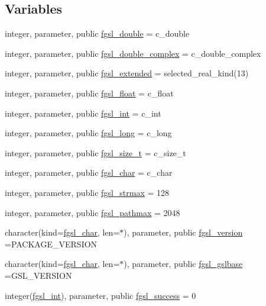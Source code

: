 \subsection*{Variables}
\begin{DoxyCompactItemize}
\item 
integer, parameter, public \hyperlink{namespacefgsl_a9af5113378e0f000eb479d3f90196ddf}{fgsl\+\_\+double} = c\+\_\+double
\item 
integer, parameter, public \hyperlink{namespacefgsl_a66d0fde3788cc0c300046f8fcd07d702}{fgsl\+\_\+double\+\_\+complex} = c\+\_\+double\+\_\+complex
\item 
integer, parameter, public \hyperlink{namespacefgsl_a9f38abe97062020e8a507aaa5bc683ab}{fgsl\+\_\+extended} = selected\+\_\+real\+\_\+kind(13)
\item 
integer, parameter, public \hyperlink{namespacefgsl_a5721fab55a48ca577c4557fdb1861eb6}{fgsl\+\_\+float} = c\+\_\+float
\item 
integer, parameter, public \hyperlink{namespacefgsl_a222deda1d7a0c0e845ce4a683318efeb}{fgsl\+\_\+int} = c\+\_\+int
\item 
integer, parameter, public \hyperlink{namespacefgsl_a22fca1111887118eb07d5f9688ea38ad}{fgsl\+\_\+long} = c\+\_\+long
\item 
integer, parameter, public \hyperlink{namespacefgsl_a82c8fc2281b4c13609c41ae8b7f1cb1e}{fgsl\+\_\+size\+\_\+t} = c\+\_\+size\+\_\+t
\item 
integer, parameter, public \hyperlink{namespacefgsl_a12911ae4a4462f8e892d903081e77ab4}{fgsl\+\_\+char} = c\+\_\+char
\item 
integer, parameter, public \hyperlink{namespacefgsl_a1951faf9d6c8119266db0e5eee1865b7}{fgsl\+\_\+strmax} = 128
\item 
integer, parameter, public \hyperlink{namespacefgsl_a4531e537443b76eab7842214d4e86f01}{fgsl\+\_\+pathmax} = 2048
\item 
character(kind=\hyperlink{namespacefgsl_a12911ae4a4462f8e892d903081e77ab4}{fgsl\+\_\+char}, len=$\ast$), parameter, public \hyperlink{namespacefgsl_a3443bae7bac02745f1562e6c2f891656}{fgsl\+\_\+version} =P\+A\+C\+K\+A\+G\+E\+\_\+\+V\+E\+R\+S\+I\+O\+N
\item 
character(kind=\hyperlink{namespacefgsl_a12911ae4a4462f8e892d903081e77ab4}{fgsl\+\_\+char}, len=$\ast$), parameter, public \hyperlink{namespacefgsl_ad8d3e2a5a480d0a6e9569ef516c5dff4}{fgsl\+\_\+gslbase} =G\+S\+L\+\_\+\+V\+E\+R\+S\+I\+O\+N
\item 
integer(\hyperlink{namespacefgsl_a222deda1d7a0c0e845ce4a683318efeb}{fgsl\+\_\+int}), parameter, public \hyperlink{namespacefgsl_a5637d95a4aceec9a80a9b74a2e40ebdf}{fgsl\+\_\+success} = 0

\end{DoxyCompactItemize}
